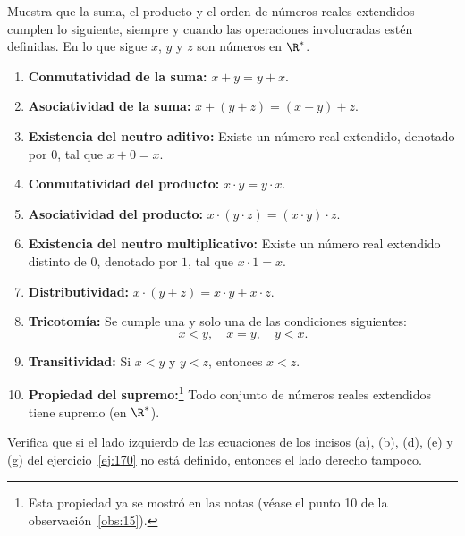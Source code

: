 \documentclass[12pt,a4paper]{book}
\begin{document}
    \begin{ejercicio}\label{ej:170}
        Muestra que la suma, el producto y el orden de números reales extendidos
        cumplen lo siguiente, siempre y cuando las operaciones involucradas estén
        definidas. En lo que sigue $x$, $y$ y $z$ son números en $\R^{*}$.
        \begin{enumerate}[nosep]
            \item \textbf{Conmutatividad de la suma:} $x+y=y+x$.
            \item \textbf{Asociatividad de la suma:} $x+(y+z)=(x+y)+z$.
            \item \textbf{Existencia del neutro aditivo:} Existe un número real extendido, denotado
            por $0$, tal que $x+0=x$.
            \item \textbf{Conmutatividad del producto:} $x\cdot y=y\cdot x$.
            \item \textbf{Asociatividad del producto:} $x\cdot(y\cdot z)=(x\cdot y)\cdot z$.
            \item \textbf{Existencia del neutro multiplicativo:} Existe un número real extendido
            distinto de $0$, denotado por $1$, tal que $x\cdot 1=x$.
            \item \textbf{Distributividad:} $x\cdot(y+z)=x\cdot y+x\cdot z$.
            \item \textbf{Tricotomía:} Se cumple una y solo una de las condiciones siguientes:
            \begin{equation*}
                x<y,\quad x=y,\quad y<x.
            \end{equation*}
            \item \textbf{Transitividad:} Si $x<y$ y $y<z$, entonces $x<z$.
            \item \textbf{Propiedad del supremo:}\footnote{Esta propiedad ya se mostró en las notas (véase el punto 10 de la observación~\ref{obs:15}).} Todo conjunto de números reales extendidos
            tiene supremo (en $\R^{*}$).
        \end{enumerate}
    \end{ejercicio}

    \begin{ejercicio}\label{ej:171}
        Verifica que si el lado izquierdo de las ecuaciones de los incisos
        (a), (b), (d), (e) y (g) del ejercicio~\ref{ej:170} no está definido, entonces el lado
        derecho tampoco.
    \end{ejercicio}
\end{document}
